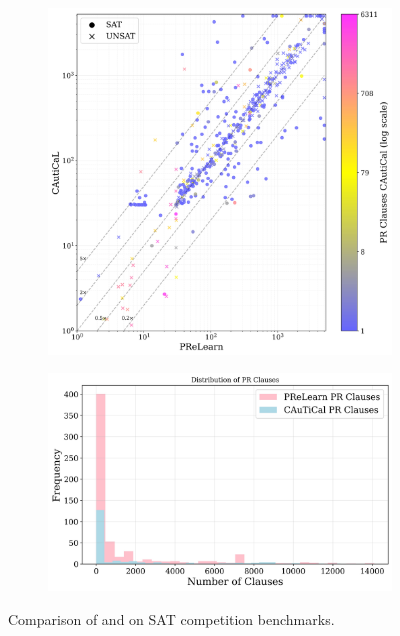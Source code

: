   \begin{figure}[!t]
    \centering
    \begin{subfigure}[t]{0.45\textwidth}
        \centering
        \includegraphics[width=\textwidth]{figs/prelearn_vs_cautical.jpg}
        \label{fig:cautical-vs-cadical}
    \end{subfigure}
    \begin{subfigure}[t]{0.45\textwidth}
        \centering
        \includegraphics[width=\textwidth]{figs/clauses_histogram.jpg}
        \label{fig:cautical-vs-prelearn}
    \end{subfigure}
    \caption{Comparison of \tool and \prelearn on SAT competition benchmarks.}
\end{figure}






